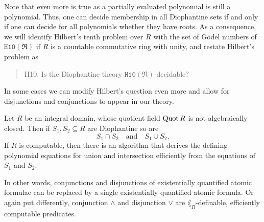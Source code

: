 Note that even more is true as a partially evaluated polynomial is still a
polynomial. Thus, one can decide membership in all Diophantine sets if and only
if one can decide for all polynomials whether they have roots. As a consequence,
we will identify Hilbert's tenth problem over \(R\) with the set of Gödel
numbers of \(\mathtt{H10}(\mathfrak{R})\) if \(R\) is a countable commutative
ring with unity, and restate Hilbert's problem as
\begin{quote}
  \textsc{H10.} Is the Diophantine theory \(\mathtt{H10}(\mathfrak{R})\)
  decidable?
\end{quote}
In some cases we can modify Hilbert's question even more and allow for
disjunctions and conjunctions to appear in our theory.

\begin{lem}\label{lem:intersections and unions}
    Let \(R\) be an integral domain, whose quotient field \(\operatorname{Quot} R\) is not
    algebraically closed. Then if \(S_1, S_2 \subseteq R\) are Diophantine so
    are
    \[
      S_1 ∩ S_2 \quad \text{and} \quad S_1 ∪ S_2.
    \]
    If \(R\) is computable, then there is an algorithm that derives the defining
    polynomial equations for union and intersection efficiently from the
    equations of \(S_1\) and \(S_2\).
\end{lem}

In other words, conjunctions and disjunctions of existentially quantified atomic
formulae can be replaced by a single existentially quantified atomic formula. Or
again put differently, conjunction \(∧\) and disjunction \(∨\) are
\(\lang_R\)-definable, efficiently computable predicates.

